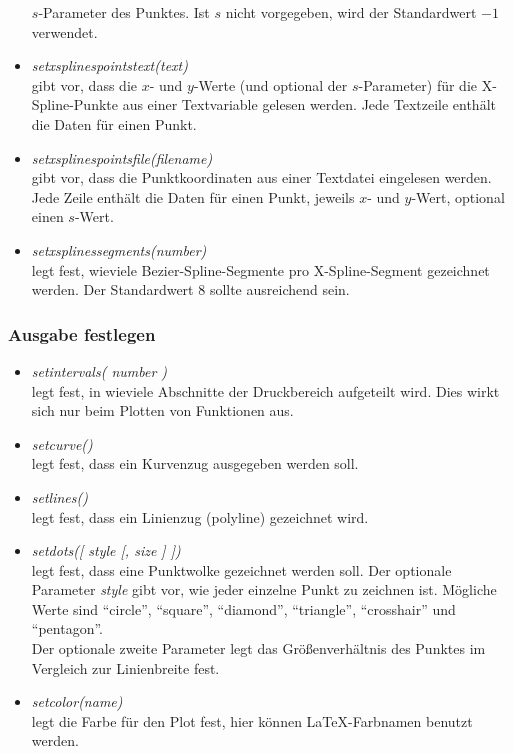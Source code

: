\documentclass[ngerman,origlongtable]{scrartcl}
\begin{document}
\begin{itemize}
\(s\)-Parameter des Punktes. Ist \(s\) nicht vorgegeben, wird der Standardwert
\(-1\) verwendet.
\item	\textit{set\textunderscore{}xsplines\textunderscore{}points\textunderscore{}text(text)}\\
gibt vor, dass die \(x\)- und \(y\)-Werte (und optional der \(s\)-Parameter)
für die X-Spline-Punkte aus einer Textvariable gelesen werden.
Jede Textzeile enthält die Daten für einen Punkt.
\item	\textit{set\textunderscore{}xsplines\textunderscore{}points\textunderscore{}file(filename)\/}\\
gibt vor, dass die Punktkoordinaten aus einer Textdatei eingelesen werden.
Jede Zeile enthält die Daten für einen Punkt, jeweils \(x\)- und
\(y\)-Wert, optional einen \(s\)-Wert.
\item	\textit{set\textunderscore{}xsplines\textunderscore{}segments(number)}\\
legt fest, wieviele Bezier-Spline-Segmente pro X-Spline-Segment gezeichnet
werden. Der Standardwert 8 sollte ausreichend sein.
\end{itemize}
\subsubsection{Ausgabe festlegen}
\begin{itemize}
\item	\textit{set\textunderscore{}intervals( number )\/}\\
legt fest, in wieviele Abschnitte der Druckbereich aufgeteilt wird.
Dies wirkt sich nur beim Plotten von Funktionen aus.
\item	\textit{set\textunderscore{}curve()\/}\\
legt fest, dass ein Kurvenzug ausgegeben werden soll.
\item	\textit{set\textunderscore{}lines()\/}\\
legt fest, dass ein Linienzug (polyline) gezeichnet wird.
\item	\textit{set\textunderscore{}dots([ style [, size ]  ])\/}\\
legt fest, dass eine Punktwolke gezeichnet werden soll.
Der optionale Parameter 
\textit{style} gibt vor, wie jeder einzelne Punkt zu zeichnen
ist. Mögliche Werte sind
"`circle"', "`square"', "`diamond"', "`triangle"', "`crosshair"' und
"`pentagon"'.\\
Der optionale zweite Parameter legt das Größenverhältnis des Punktes
im Vergleich zur Linienbreite fest.
\item	\textit{set\textunderscore{}color(name)\/}\\
legt die Farbe für den Plot fest, hier können \LaTeX{}-Farbnamen
benutzt werden.
\end{itemize}
\end{document}
